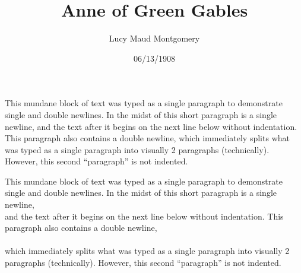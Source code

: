 \documentclass[a4paper]{article}
\title{Anne of Green Gables}
\author{Lucy Maud Montgomery}
\date{06/13/1908}
\begin{document}
\maketitle

This mundane block of text was typed as a single paragraph to demonstrate single and double newlines. In the midst of this short paragraph is a single newline, \newline and the text after it begins on the next line below without indentation. This paragraph also contains a double newline, \newline \newline which immediately splits what was typed as a single paragraph into visually 2 paragraphs (technically). However, this second ``paragraph'' is not indented.

This mundane block of text was typed as a single paragraph to demonstrate single and double newlines. In the midst of this short paragraph is a single newline,\\and the text after it begins on the next line below without indentation. This paragraph also contains a double newline,\\\\which immediately splits what was typed as a single paragraph into visually 2 paragraphs (technically). However, this second ``paragraph'' is not indented.
\end{document}
